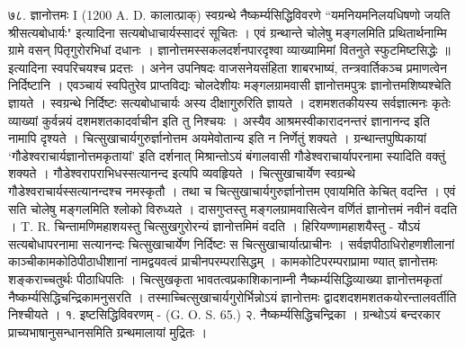 ७८. ज्ञानोत्तमः I (1200 A. D. कालात्प्राक्‌)
स्वग्रन्थे नैष्कर्म्यसिद्धिविवरणे ``यमनियमनिलयधिषणो जयति श्रीसत्यबोधार्यः" इत्यादिना सत्यबोधाचार्यस्सादरं सूचितः । एवं ग्रन्थान्ते
चोलेषु मङ्गलमिति प्रथितार्थनाम्मि ग्रामे वसन् पितृगुरोरभिधां दधानः । ज्ञानोत्तमस्सकलदर्शनपारदृश्वा व्याख्यामिमां वितनुते स्फुटमिष्टसिद्धेः ॥
इत्यादिना स्वपरिचयश्च प्रदत्तः । अनेन उपनिषदः वाजसनेयसंहिता शाबरभाष्यं, तन्त्रवार्तिकञ्च प्रमाणत्वेन निर्दिष्टानि । एवञ्चायं स्वपितुरेव प्राप्तविद्यः चोलदेशीयः मङ्गलग्रामवासी ज्ञानोत्तमपुत्रः ज्ञानोत्तमशिष्यश्चेति ज्ञायते । स्वग्रन्थे निर्दिष्टः सत्यबोधाचार्यः अस्य दीक्षागुरुरिति ज्ञायते । दशमशतकीयस्य सर्वज्ञात्मनः कृतेः व्याख्यां कुर्वन्नयं दशमशतकादर्वाचीन इति तु निश्चयः । अस्यैव आश्रमस्वीकारादनन्तरं ज्ञानानन्द इति नामापि दृश्यते ।
चित्सुखाचार्यगुरुर्ज्ञानोत्तम अयमेवोतान्य इति न निर्णेतुं शक्यते । ग्रन्थान्तपुष्पिकायां `गौडेश्वराचार्यज्ञानोत्तमकृतायां' इति दर्शनात् मिश्रान्तोऽयं बंगालवासी गौडेश्वराचार्यापरनामा स्यादिति वक्तुं शक्यते । गौडेश्वरापराभिधस्सत्यानन्द इत्यपि व्यवहृियते । चित्सुखाचार्येण स्वग्रन्थे गौडेश्वराचार्यस्सत्यानन्दश्च नमस्कृतौ । तथा च चित्सुखाचार्यगुरुर्ज्ञानोत्तम एवायमिति केचित् वदन्ति । एवं सति चोलेषु मङ्गलमिति श्लोको विरुध्यते ।
दासगुप्तस्तु मङ्गलग्रामवासित्वेन वर्णितं ज्ञानोत्तमं नवीनं वदति । T. R. चिन्तामणिमहाशयस्तु चित्सुखगुरोरन्यं ज्ञानोत्तमिमं वदति ।
हिरियण्णामहाशयैस्तु - यौऽयं सत्यबोधापरनामा सत्यानन्दः चित्सुखाचार्येण निर्दिष्टः स चित्सुखाचार्यात्प्राचीनः । सर्वज्ञपीठाधिरोहणशीलानां काञ्चीकामकोठिपीठाधीशानां नामद्वयवत्वं प्राचीनपरम्परासिद्धम् । कामकोटिपरम्पराप्रामा ण्यात् ज्ञानोत्तमः शङ्कराच्चतुर्थः पीठाधिपतिः । चित्सुखकृता भावतत्वप्रकाशिकानाम्नी नैष्कर्म्यसिद्धिव्याख्या ज्ञानोत्तमकृतां नैष्कर्म्यसिद्धिचन्द्रिकामनुसरति । तस्माच्चित्सुखाचार्यगुरोर्भिन्नोऽयं ज्ञानोत्तमः द्वादशदशमशतकयोरन्तालवर्तीति निश्चीयते ।
१. इष्टसिद्धिविवरणम् - (G. O. S. 65.)
२. नैष्कर्म्यसिद्धिचन्द्रिका । ग्रन्थोऽयं बन्दरकार प्राच्यभाषानुसन्धानसमिति ग्रन्थमालायां मुद्रितः ।

